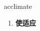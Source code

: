 
\begin{frame}
{\huge acclimate}
\begin{center}
\begin{enumerate}\Large
  \item \textbf{使适应}
\end{enumerate}
\end{center}
\end{frame}
